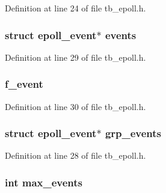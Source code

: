 Definition at line 24 of file tb\-\_\-epoll.\-h.

\hypertarget{structtb__epoll__t_a18bcd14e4d4cab5184d3b046754cd248}{
\subsubsection[{events}]{\setlength{\rightskip}{0pt plus 5cm}struct epoll\-\_\-event$\ast$ events}}\label{structtb__epoll__t_a18bcd14e4d4cab5184d3b046754cd248}


Definition at line 29 of file tb\-\_\-epoll.\-h.

\hypertarget{structtb__epoll__t_a9b459c4abc5f43de26364e0923fcfbdf}{
\subsubsection[{f\-\_\-event}]{ f\-\_\-event}}\label{structtb__epoll__t_a9b459c4abc5f43de26364e0923fcfbdf}


Definition at line 30 of file tb\-\_\-epoll.\-h.

\hypertarget{structtb__epoll__t_aac2af089be9cb8e9bf9c5d5810efc7dc}{
\subsubsection[{grp\-\_\-events}]{\setlength{\rightskip}{0pt plus 5cm}struct epoll\-\_\-event$\ast$ grp\-\_\-events}}\label{structtb__epoll__t_aac2af089be9cb8e9bf9c5d5810efc7dc}


Definition at line 28 of file tb\-\_\-epoll.\-h.

\hypertarget{structtb__epoll__t_af33c7ec0520688c34f813b2ef1e2a8a8}{
\subsubsection[{max\-\_\-events}]{\setlength{\rightskip}{0pt plus 5cm}int max\-\_\-events}}\label{structtb__epoll__t_af33c7ec0520688c34f813b2ef1e2a8a8}



